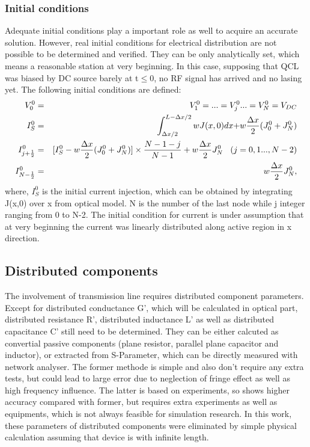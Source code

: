 \documentclass[11pt,final]{scrbook}
\begin{document}
\subsubsection{Initial conditions}
Adequate initial conditions play a important role as well to acquire an accurate solution. However, real initial conditions for electrical distribution are not possible to be determined and verified. They can be only analytically set, which means a reasonable station at very beginning. In this case, supposing that QCL was biased by DC source barely at t$\leqslant 0$, no RF signal has arrived and no lasing yet. The following initial conditions are defined:
\begin{eqnarray}
V_{0}^{0} &=& V_{1}^{0} =...=V_{j}^{0}...=V_{N}^{0} = V_{DC}\\
I_{S}^{0}&=&\int _{ \Delta x/2 }^{ L-\Delta x/2 }{ wJ(x,0)dx+ } w\frac { \Delta x }{ 2 } (J_{ 0 }^{ 0 }+J_{ N }^{ 0 })\label{Eqn. Is}\\
I_{j+\frac{1}{2}}^{0} &=& [I_{S}^{0}-w\frac{\Delta x}{2}(J_{0}^{0}+J_{N}^{0})]\times \frac{N-1-j}{N-1}+w\frac{\Delta x}{2}J_{N}^{0} \hspace{3mm} (j=0,1...,N-2)\\
I_{N-\frac{1}{2}}^{0}&=&w\frac{\Delta x}{2}J_{N}^{0},
\end{eqnarray}
where, $I_{S}^{0}$ is the initial current injection, which can be obtained by integrating J(x,0) over x from optical model. N is the number of the last node while j integer ranging from 0 to N-2. The initial condition for current is under assumption that at very beginning the current was linearly distributed along active region in x direction.

\subsection{Distributed components}
The involvement of transmission line requires distributed component parameters. Except for distributed conductance G', which will be calculated in optical part, distributed resistance R', distributed inductance L' as well as distributed capacitance C' still need to be determined. They can be either calcuted as convertial passive components (plane resistor, parallel plane capacitor and inductor), or extracted from S-Parameter, which can be directly measured with network analyser. The former methode is simple and also don't require any extra tests, but could lead to large error due to neglection of fringe effect\cite{pillai1970fringing} as well as high frequency influence. The latter is based on experiments, so shows higher accuracy compared with former, but requires extra experiments as well as equipments, which is not always feasible for simulation research. In this work, these parameters of distributed components were eliminated by simple physical calculation assuming that device is with infinite length.
\end{document}
